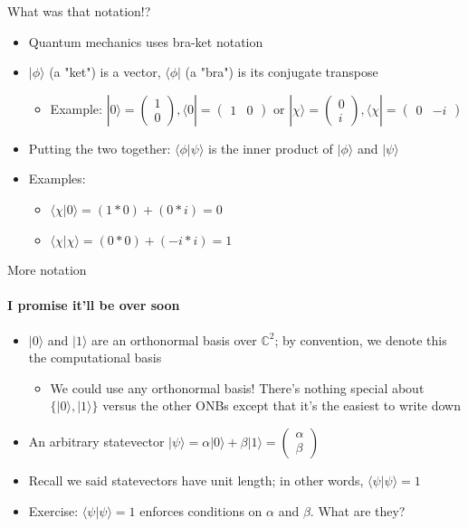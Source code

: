 \documentclass[aspectratio=169]{beamer}
\newcommand{\twovec}[2]{\begin{pmatrix} #1 \\ #2 \end{pmatrix}}
\newcommand{\tworvec}[2]{\begin{pmatrix} #1 & #2 \end{pmatrix}}
\begin{document}
\begin{frame}{What was that notation!?}
    \begin{itemize}
        \item Quantum mechanics uses \textcolor{sigma@mainblue}{bra-ket notation} \pause
        \item $|\phi \rangle$ (a "ket") is a vector, $\langle \phi |$ (a "bra") is its conjugate transpose \pause
        \begin{itemize}
            \item Example: $|0\rangle = \twovec{1}{0}, \langle 0 | = \tworvec{1}{0}$ or $|\chi\rangle = \twovec{0}{i}, \langle \chi | = \tworvec{0}{-i}$
        \end{itemize} \pause
        \item Putting the two together: $\langle \phi | \psi \rangle$ is the inner product of $| \phi \rangle$ and $| \psi \rangle$ \pause
        \item Examples:
        \begin{itemize}
            \item $\langle \chi | 0 \rangle = (1*0) + (0 * i) = 0$ \pause
            \item $\langle \chi | \chi \rangle = (0*0) + (-i * i) = 1$
        \end{itemize}
    \end{itemize}
\end{frame}

\begin{frame}{More notation}
\framesubtitle{I promise it'll be over soon}
    \begin{itemize}
        \item $|0\rangle$ and $|1\rangle$ are an orthonormal basis over $\mathbb{C}^2$; by convention, we denote this the \textcolor{sigma@mainblue}{computational basis} \pause
        \begin{itemize}
            \item We could use any orthonormal basis! There's nothing special about $\{|0\rangle, |1\rangle\}$ versus the other ONBs except that it's the easiest to write down
        \end{itemize} \pause
        \item An arbitrary statevector $|\psi\rangle = \alpha|0\rangle + \beta|1\rangle = \twovec{\alpha}{\beta}$ \pause
        \item Recall we said statevectors have unit length; in other words, $\langle \psi | \psi \rangle = 1$ \pause
        \item Exercise: $\langle \psi | \psi \rangle = 1$ enforces conditions on $\alpha$ and $\beta$. What are they?
    \end{itemize}
\end{frame}
\end{document}
